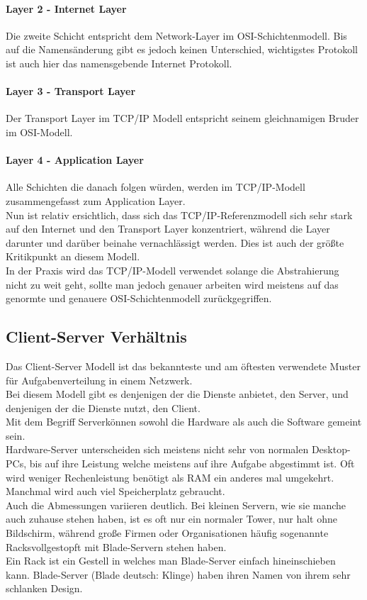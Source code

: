 \documentclass[11pt,a4paper]{report}
\begin{document}
\paragraph{Layer 2 - Internet Layer}
Die zweite Schicht entspricht dem Network-Layer im OSI-Schichtenmodell. Bis auf die Namensänderung gibt es jedoch keinen Unterschied, wichtigstes Protokoll ist auch hier das namensgebende Internet Protokoll.

\paragraph{Layer 3 - Transport Layer}
Der Transport Layer im TCP/IP Modell entspricht seinem gleichnamigen Bruder im OSI-Modell. 

\paragraph{Layer 4 - Application Layer}
Alle Schichten die danach folgen würden, werden im TCP/IP-Modell zusammengefasst zum Application Layer.\\

Nun ist relativ ersichtlich, dass sich das TCP/IP-Referenzmodell sich sehr stark auf den Internet und den Transport Layer konzentriert, während die Layer darunter und darüber beinahe vernachlässigt werden. Dies ist auch der größte Kritikpunkt an diesem Modell.\\
In der Praxis wird das TCP/IP-Modell verwendet solange die Abstrahierung nicht zu weit geht, sollte man jedoch genauer arbeiten wird meistens auf das genormte und genauere OSI-Schichtenmodell zurückgegriffen.
\subsection{Client-Server Verhältnis}
Das Client-Server Modell ist das bekannteste und am öftesten verwendete Muster für Aufgabenverteilung in einem Netzwerk.\\ 
Bei diesem Modell gibt es denjenigen der die Dienste anbietet, den Server, und denjenigen der die Dienste nutzt, den Client.\\

Mit dem Begriff \glqq Server\grqq können sowohl die Hardware als auch die Software gemeint sein.\\
Hardware-Server unterscheiden sich meistens nicht sehr von normalen Desktop-PCs, bis auf ihre Leistung welche meistens auf ihre Aufgabe abgestimmt ist. Oft wird weniger Rechenleistung benötigt als RAM ein anderes mal umgekehrt. Manchmal wird auch viel Speicherplatz gebraucht.\\
Auch die Abmessungen variieren deutlich. Bei kleinen Servern, wie sie manche auch zuhause stehen haben, ist es oft nur ein normaler Tower, nur halt ohne Bildschirm, während große Firmen oder Organisationen häufig sogenannte \glqq Racks\grqq vollgestopft mit Blade-Servern stehen haben.\\
Ein Rack ist ein Gestell in welches man Blade-Server einfach hineinschieben kann. Blade-Server (Blade deutsch: Klinge) haben ihren Namen von ihrem sehr schlanken Design.\\
\end{document}
